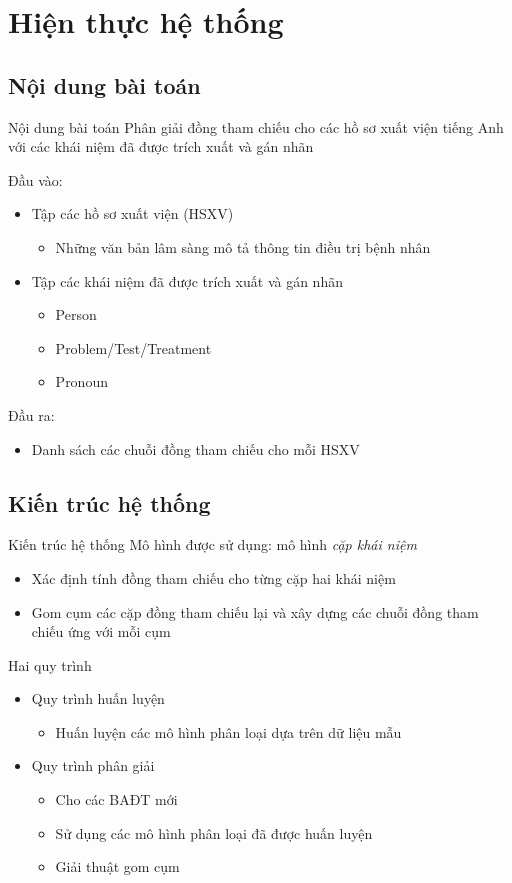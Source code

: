 \section{Hiện thực hệ thống}
\subsection{Nội dung bài toán}
\begin{frame}{Nội dung bài toán}
\putlogo
Phân giải đồng tham chiếu cho các hồ sơ xuất viện tiếng Anh với các khái niệm đã được trích xuất và gán nhãn

Đầu vào:
\begin{itemize}
	\item Tập các hồ sơ xuất viện (HSXV)
	\begin{itemize}
		\item Những văn bản lâm sàng mô tả thông tin điều trị bệnh nhân
	\end{itemize}
	\item Tập các khái niệm đã được trích xuất và gán nhãn
	\begin{itemize}
		\item Person
		\item Problem/Test/Treatment
		\item Pronoun
	\end{itemize}
\end{itemize}

Đầu ra: 
\begin{itemize}
\item Danh sách các chuỗi đồng tham chiếu cho mỗi HSXV
\end{itemize}
\end{frame}

\subsection{Kiến trúc hệ thống}
\begin{frame}{Kiến trúc hệ thống}
\putlogo
Mô hình được sử dụng: mô hình \emph{cặp khái niệm}
\begin{itemize}
	\item Xác định tính đồng tham chiếu cho từng cặp hai khái niệm
	\item Gom cụm các cặp đồng tham chiếu lại và xây dựng các chuỗi đồng tham chiếu ứng với mỗi cụm
\end{itemize}
Hai quy trình
\begin{itemize}
	\item Quy trình huấn luyện
	\begin{itemize}
		\item Huấn luyện các mô hình phân loại dựa trên dữ liệu mẫu 
	\end{itemize}
	\item Quy trình phân giải
	\begin{itemize}
		\item Cho các BAĐT mới
		\item Sử dụng các mô hình phân loại đã được huấn luyện
		\item Giải thuật gom cụm
	\end{itemize}
\end{itemize}
\end{frame}

